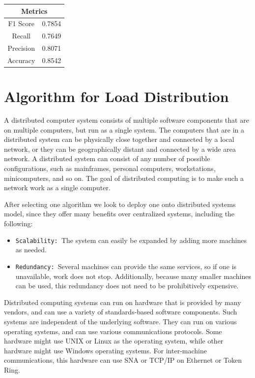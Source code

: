 \documentclass[12pt]{article}
\begin{document}
\begin{table}[ht]
\centering
\begin{tabular}{|c|c|}
\hline
\multicolumn{2}{|c|}{Metrics} \\ \hline
F1 Score        & 0.7854      \\ \hline
Recall          & 0.7649      \\ \hline
Precision       & 0.8071      \\ \hline
Accuracy        & 0.8542      \\ \hline
\end{tabular}
\label{table:15}
\end{table}


\clearpage
\newpage
\section{Algorithm for Load Distribution}
A distributed computer system consists of multiple software components that are on multiple computers, but run as a single system. The computers that are in a distributed system can be physically close together and connected by a local network, or they can be geographically distant and connected by a wide area network. A distributed system can consist of any number of possible configurations, such as mainframes, personal computers, workstations, minicomputers, and so on. The goal of distributed computing is to make such a network work as a single computer.

After selecting one algorithm we look to deploy one onto distributed systems model\cite{IBM}, since they offer many benefits over centralized systems, including the following:
\begin{itemize}
\item
\texttt{Scalability: }The system can easily be expanded by adding more machines as needed.
\item
\texttt{Redundancy: }Several machines can provide the same services, so if one is unavailable, work does not stop. Additionally, because many smaller machines can be used, this redundancy does not need to be prohibitively expensive.
\end{itemize}
Distributed computing systems can run on hardware that is provided by many vendors, and can use a variety of standards-based software components. Such systems are independent of the underlying software. They can run on various operating systems, and can use various communications protocols. Some hardware might use UNIX or Linux as the operating system, while other hardware might use Windows operating systems. For inter-machine communications, this hardware can use SNA or TCP/IP on Ethernet or Token Ring.
\end{document}
